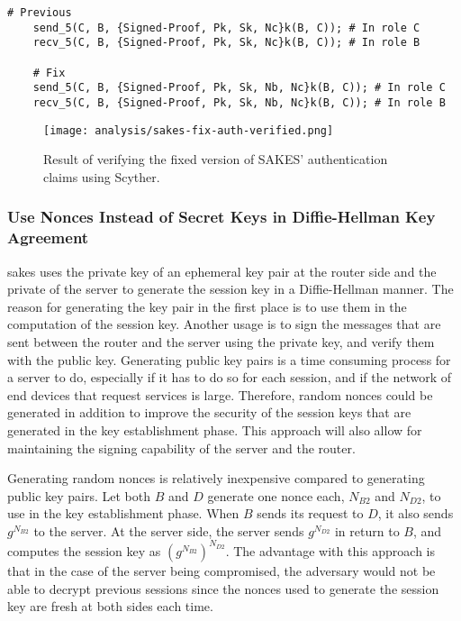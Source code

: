 \begin{lstlisting}[caption={Fix to the SAKES protocol to provide non-injective synchronization and data agreement for the end router $B$ during the authentication phase.}, label={lst:fix-nisynch-b-auth}]
	# Previous
	send_5(C, B, {Signed-Proof, Pk, Sk, Nc}k(B, C)); # In role C
	recv_5(C, B, {Signed-Proof, Pk, Sk, Nc}k(B, C)); # In role B
	
	# Fix
	send_5(C, B, {Signed-Proof, Pk, Sk, Nb, Nc}k(B, C)); # In role C
	recv_5(C, B, {Signed-Proof, Pk, Sk, Nb, Nc}k(B, C)); # In role B
\end{lstlisting}
\newpage

\begin{figure}[H]
	\centering
	\texttt{[image: analysis/sakes-fix-auth-verified.png]}
	\caption{Result of verifying the fixed version of SAKES' authentication claims using Scyther.}
	\label{fig:sakes-fix-verified-auth}
\end{figure}



\subsubsection{Use Nonces Instead of Secret Keys in Diffie-Hellman Key Agreement}

\gls{sakes} uses the private key of an ephemeral key pair at the router side and the private of the server to generate the session key in a Diffie-Hellman manner. The reason for generating the key pair in the first place is to use them in the computation of the session key. Another usage is to sign the messages that are sent between the router and the server using the private key, and verify them with the public key. Generating public key pairs is a time consuming process for a server to do, especially if it has to do so for each session, and if the network of end devices that request services is large. Therefore, random nonces could be generated in addition to improve the security of the session keys that are generated in the key establishment phase. This approach will also allow for maintaining the signing capability of the server and the router.

Generating random nonces is relatively inexpensive compared to generating public key pairs. Let both $B$ and $D$ generate one nonce each, $N_{B2}$ and $N_{D2}$, to use in the key establishment phase. When $B$ sends its request to $D$, it also sends $g^{N_{B2}}$ to the server. At the server side, the server sends $g^{N_{D2}}$ in return to $B$, and computes the session key as $(g^{N_{B2}})^{N_{D2}}$. The advantage with this approach is that in the case of the server being compromised, the adversary would not be able to decrypt previous sessions since the nonces used to generate the session key are fresh at both sides each time. %


